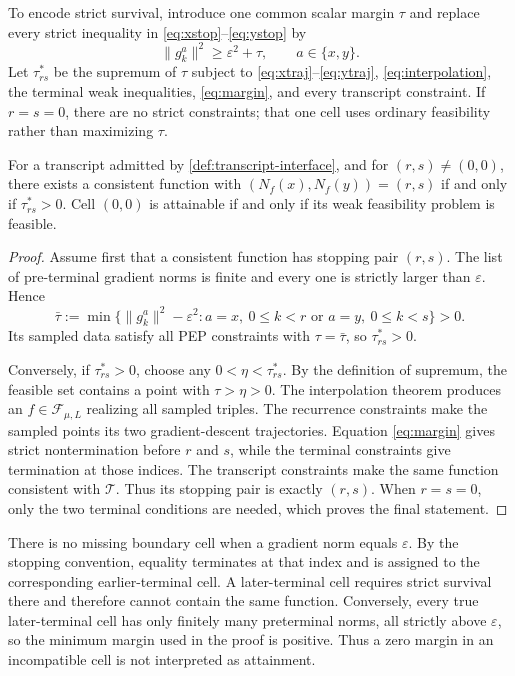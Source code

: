 \documentclass[smallextended]{svjour3}
\newcommand{\cF}{\mathcal{F}}
\newcommand{\cT}{\mathcal{T}}
\newcommand{\norm}[1]{\lVert #1\rVert}
\newcommand{\eps}{\varepsilon}
\begin{document}
To encode strict survival, introduce one common scalar margin $\tau$ and
replace every strict inequality in \eqref{eq:xstop}--\eqref{eq:ystop} by
\begin{equation}
 \norm{g_k^a}^2\geq\eps^2+\tau,\qquad a\in\{x,y\}.
 \label{eq:margin}
\end{equation}
Let $\tau_{rs}^*$ be the supremum of $\tau$ subject to
\eqref{eq:xtraj}--\eqref{eq:ytraj}, \eqref{eq:interpolation}, the terminal
weak inequalities, \eqref{eq:margin}, and every transcript constraint.  If
$r=s=0$, there are no strict constraints; that one cell uses ordinary
feasibility rather than maximizing $\tau$.

\begin{theorem}
\label{thm:cell}
For a transcript admitted by \cref{def:transcript-interface}, and for
$(r,s)\neq(0,0)$,
there exists a consistent function with
$(N_f(x),N_f(y))=(r,s)$ if and only if $\tau_{rs}^*>0$.  Cell $(0,0)$ is
attainable if and only if its weak feasibility problem is feasible.
\end{theorem}

\begin{proof}
Assume first that a consistent function has stopping pair $(r,s)$.  The list of
pre-terminal gradient norms is finite and every one is strictly larger than
$\eps$.  Hence
\[
 \bar\tau:=\min\{\norm{g_k^a}^2-\eps^2:
 a=x,\ 0\leq k<r\text{ or }a=y,\ 0\leq k<s\}>0.
\]
Its sampled data satisfy all PEP constraints with $\tau=\bar\tau$, so
$\tau_{rs}^*>0$.

Conversely, if $\tau_{rs}^*>0$, choose any
$0<\eta<\tau_{rs}^*$.  By the definition of supremum, the feasible set
contains a point with $\tau>\eta>0$.  The interpolation
theorem produces an $f\in\cF_{\mu,L}$ realizing all sampled triples.
The recurrence constraints make the sampled points its two gradient-descent
trajectories.  Equation \eqref{eq:margin} gives strict nontermination before
$r$ and $s$, while the terminal constraints give termination at those indices.
The transcript constraints make the same function consistent with $\cT$.
Thus its stopping pair is exactly $(r,s)$.  When $r=s=0$, only the two terminal
conditions are needed, which proves the final statement.
\end{proof}

There is no missing boundary cell when a gradient norm equals $\eps$.  By the
stopping convention, equality terminates at that index and is assigned to the
corresponding earlier-terminal cell.  A later-terminal cell requires strict
survival there and therefore cannot contain the same function.  Conversely,
every true later-terminal cell has only finitely many preterminal norms, all
strictly above $\eps$, so the minimum margin used in the proof is positive.
Thus a zero margin in an incompatible cell is not interpreted as attainment.
\end{document}
